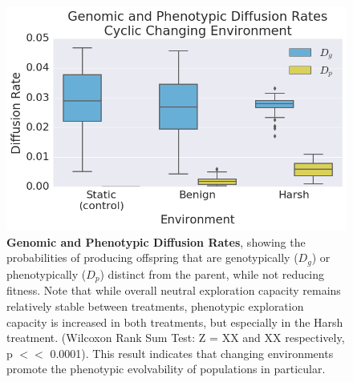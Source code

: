 \documentclass[PhD]{msu-thesis}
\begin{document}

	\begin{figure}[!h] %
	\includegraphics[trim={0.2cm 0 0.4cm 0.25cm},clip,width=0.75\columnwidth]{figures/CE/CCE_D_g_D_p__box.png}
	\caption{\textbf{Genomic and Phenotypic Diffusion Rates}, showing the probabilities of producing offspring that are genotypically ($D_g$) or phenotypically ($D_p$) distinct from the parent, while not reducing fitness.
	Note that while overall neutral exploration capacity remains relatively stable between treatments, phenotypic exploration capacity is increased in both treatments, but especially in the Harsh treatment. (Wilcoxon Rank Sum Test: Z = XX and XX respectively, p $<<$ 0.0001). This result indicates that changing environments promote the phenotypic evolvability of populations in particular.
	}\label{fig:CCE_diffusion_rate}
	\end{figure}
\end{document}
